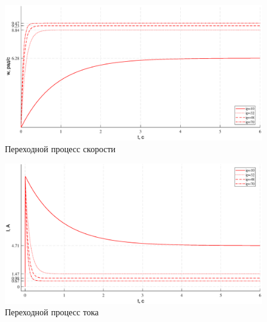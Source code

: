 \documentclass[a4paper,12pt]{article}
\begin{document}
		\begin{figure}[h!]
		\renewcommand{\figurename}{Рисунок}
		\centering
		\includegraphics[width=6in]{wm80.eps}
		\caption{Переходной процесс скорости}
		\label{s_w}
	\end{figure}
			
			
				\begin{figure}[h!]
				\renewcommand{\figurename}{Рисунок}
				\centering
				\includegraphics[width=6in]{im80.eps}
				\caption{Переходной процесс тока}
				\label{s_i}
			\end{figure}
		
	\newpage
\end{document}
